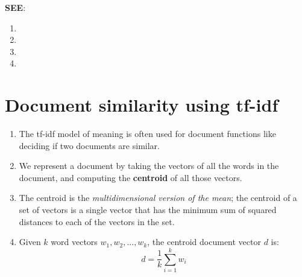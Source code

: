 \noindent \textbf{SEE}:
\begin{enumerate}
    \item {}
    \item {}
    \item {}
    \item {}
\end{enumerate}


\section{Document similarity using tf-idf}
\begin{enumerate}
    \item The tf-idf model of meaning is often used for document functions like deciding if two documents are similar.

    \item We represent a document by taking the vectors of all the words in the document, and computing the \textbf{centroid} of all those vectors.
    
    \item The centroid is the \textit{multidimensional version of the mean}; the centroid of a set of vectors is a single vector that has the minimum sum of squared distances to each of the vectors in the set.

    \item Given $k$ word vectors $w_1,w_2,...,w_k$, the centroid document vector $d$ is:
    \[
        \displaystyle d = \dfrac{1}{k}\displaystyle\sum_{i=1}^{k} w_i
    \]

    

\end{enumerate}


































